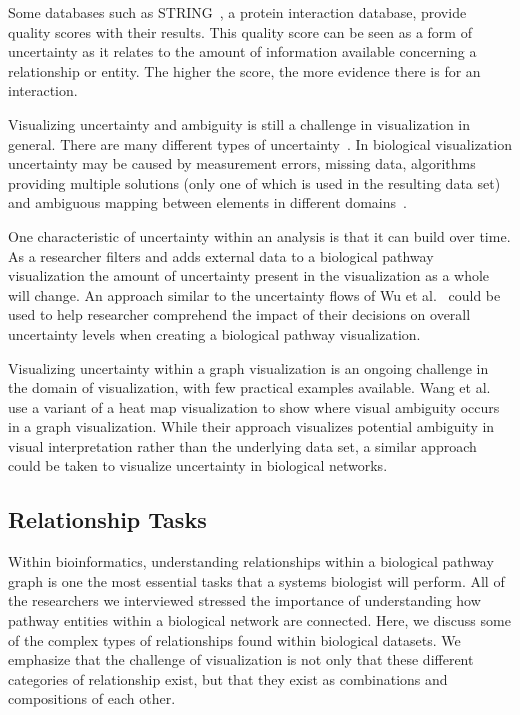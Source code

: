 \documentclass[twocolumn]{bmcart}%
\begin{document}
Some databases such as STRING~\cite{STRING2005}, a protein interaction database, provide quality scores with their results.
This quality score can be seen as a form of uncertainty as it relates to the amount of information available concerning a relationship or entity.
The higher the score, the more evidence there is for an interaction.

Visualizing uncertainty and ambiguity is still a challenge in visualization in general.
There are many different types of uncertainty~\cite{skeels2010uncertainty}.
In biological visualization uncertainty may be caused by measurement errors, missing data, algorithms providing multiple solutions (only one of which is used in the resulting data set) and ambiguous mapping between elements in different domains~\cite{kohlbacher2014multivariate}.

One characteristic of uncertainty within an analysis is that it can build over time.
As a researcher filters and adds external data to a biological pathway visualization the amount of uncertainty present in the visualization as a whole will change.
An approach similar to the uncertainty flows of Wu et al.~\cite{wu2012uncertainty} could be used to help researcher comprehend the impact of their decisions on overall uncertainty levels when creating a biological pathway visualization.


Visualizing uncertainty within a graph visualization is an ongoing challenge in the domain of visualization, with few practical examples available.
Wang et al.~\cite{wang2016ambiguityvis} use a variant of a heat map visualization to show where visual ambiguity occurs in a graph visualization.
While their approach visualizes potential ambiguity in visual interpretation rather than the underlying data set, a similar approach could be taken to visualize uncertainty in biological networks.

\subsection*{Relationship Tasks}

Within bioinformatics,  understanding relationships within a biological pathway graph is one the most essential tasks that a systems biologist will perform.
All of the researchers we interviewed stressed the importance of understanding how pathway entities within a biological network are connected.
Here, we discuss some of the complex types of relationships found within biological datasets.
We emphasize that the challenge of visualization is not only that these different categories of relationship exist, but that they exist as combinations and compositions of each other.
\end{document}
